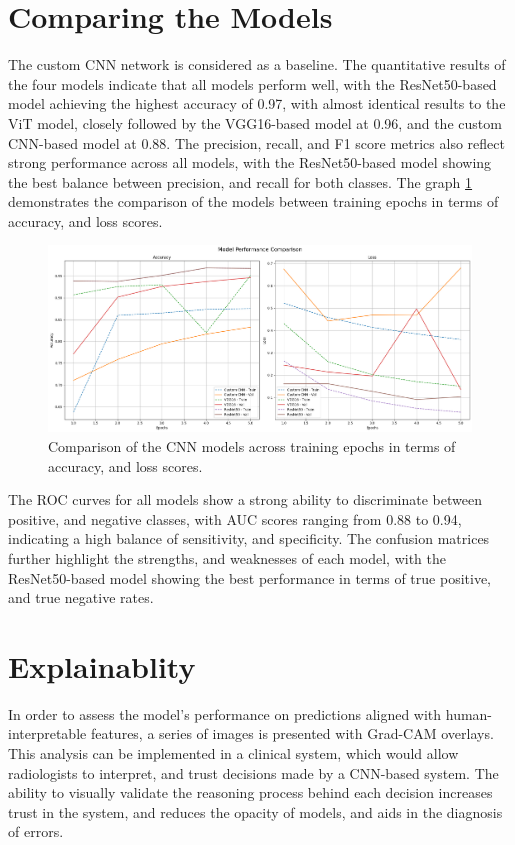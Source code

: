 \documentclass[../main]{subfiles}
\begin{document}
\section{Comparing the Models}
\label{sec:comparing-models}
The custom CNN network is considered as a baseline. The quantitative results of the four models indicate that all models perform well, with the ResNet50-based model achieving the highest accuracy of 0.97, with almost identical results to the ViT model, closely followed by the VGG16-based model at 0.96, and the custom CNN-based model at 0.88. The precision, recall, and F1 score metrics also reflect strong performance across all models, with the ResNet50-based model showing the best balance between precision, and recall for both classes. The graph \ref{fig:comparison-models} demonstrates the comparison of the models between training epochs in terms of accuracy, and loss scores.

\begin{figure}[h!]
    \centering
    \includegraphics[width=1\textwidth]{assets/comparison.png}
    \caption{Comparison of the CNN models across training epochs in terms of accuracy, and loss scores.}
    \label{fig:comparison-models}
\end{figure}

\noindent The ROC curves for all models show a strong ability to discriminate between positive, and negative classes, with AUC scores ranging from 0.88 to 0.94, indicating a high balance of sensitivity, and specificity. The confusion matrices further highlight the strengths, and weaknesses of each model, with the ResNet50-based model showing the best performance in terms of true positive, and true negative rates.

\section{Explainablity}
\label{sec:explainability}
In order to assess the model's performance on predictions aligned with human-interpretable features, a series of images is presented with Grad-CAM overlays. This analysis can be implemented in a clinical system, which would allow radiologists to interpret, and trust decisions made by a CNN-based system. The ability to visually validate the reasoning process behind each decision increases trust in the system, and reduces the opacity of models, and aids in the diagnosis of errors.
\end{document}
